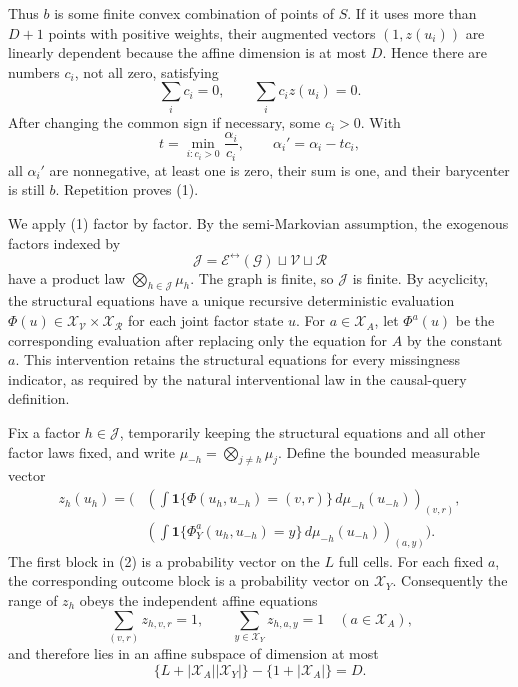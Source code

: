 Thus \(b\) is some finite convex combination of points of \(S\).  If it uses more than \(D+1\) points with positive weights, their augmented vectors \((1,z(u_i))\) are linearly dependent because the affine dimension is at most \(D\).  Hence there are numbers \(c_i\), not all zero, satisfying
\[
 \sum_i c_i=0,
 \qquad
 \sum_i c_i z(u_i)=0.
\]
After changing the common sign if necessary, some \(c_i>0\).  With
\[
 t=\min_{i:c_i>0}\frac{\alpha_i}{c_i},
 \qquad
 \alpha_i'=\alpha_i-tc_i,
\]
all \(\alpha_i'\) are nonnegative, at least one is zero, their sum is one, and their barycenter is still \(b\).  Repetition proves (1).

We apply (1) factor by factor.  By the semi-Markovian assumption, the exogenous factors indexed by
\[
 \mathcal J=\mathcal E^{\leftrightarrow}(\mathcal G)\sqcup\mathcal V\sqcup\mathcal R
\]
have a product law \(\bigotimes_{h\in\mathcal J}\mu_h\).  The graph is finite, so \(\mathcal J\) is finite.  By acyclicity, the structural equations have a unique recursive deterministic evaluation \(\Phi(u)\in\mathcal X_{\mathcal V}\times\mathcal X_{\mathcal R}\) for each joint factor state \(u\).  For \(a\in\mathcal X_A\), let \(\Phi^a(u)\) be the corresponding evaluation after replacing only the equation for \(A\) by the constant \(a\).  This intervention retains the structural equations for every missingness indicator, as required by the natural interventional law in the causal-query definition.

Fix a factor \(h\in\mathcal J\), temporarily keeping the structural equations and all other factor laws fixed, and write \(\mu_{-h}=\bigotimes_{j\neq h}\mu_j\).  Define the bounded measurable vector
\[
 \begin{aligned}
 z_h(u_h)=\Bigg(&
 \left(
   \int \mathbf 1\{\Phi(u_h,u_{-h})=(v,r)\}\,d\mu_{-h}(u_{-h})
 \right)_{(v,r)},\\
 &\left(
   \int \mathbf 1\{\Phi_Y^a(u_h,u_{-h})=y\}\,d\mu_{-h}(u_{-h})
 \right)_{(a,y)}
 \Bigg).
 \end{aligned}
 \tag{2}
\]
The first block in (2) is a probability vector on the \(L\) full cells.  For each fixed \(a\), the corresponding outcome block is a probability vector on \(\mathcal X_Y\).  Consequently the range of \(z_h\) obeys the independent affine equations
\[
 \sum_{(v,r)}z_{h,v,r}=1,
 \qquad
 \sum_{y\in\mathcal X_Y}z_{h,a,y}=1
 \quad(a\in\mathcal X_A),
\]
and therefore lies in an affine subspace of dimension at most
\[
 \{L+|\mathcal X_A||\mathcal X_Y|\}
 -\{1+|\mathcal X_A|\}
 =D.
 \tag{3}
\]

